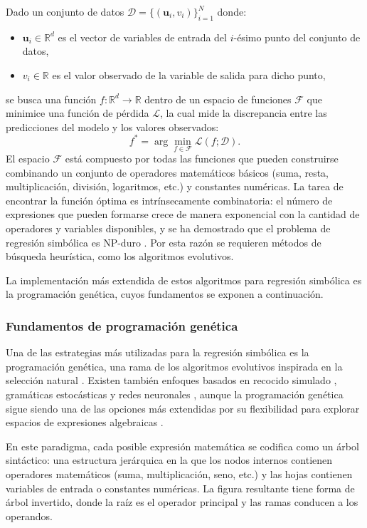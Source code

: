 \documentclass{article}
\newcommand{\R}{\mathbb{R}}
\newcommand{\loss}{\mathcal{L}}
\newcommand{\dataset}{\mathcal{D}}
\begin{document}
Dado un conjunto de datos \(\dataset = \{(\mathbf{u}_i, v_i)\}_{i=1}^{N}\) donde: \begin{itemize} \item \(\mathbf{u}_i \in \R^d\) es el vector de variables de entrada del \(i\)-ésimo punto del conjunto de datos, \item \(v_i \in \R\) es el valor observado de la variable de salida para dicho punto, \end{itemize} se busca una función \(f: \R^d \to \R\) dentro de un espacio de funciones \(\mathcal{F}\) que minimice una función de pérdida \(\loss\), la cual mide la discrepancia entre las predicciones del modelo y los valores observados: \begin{equation} f^* = \arg\min_{f \in \mathcal{F}} \loss(f; \dataset). \end{equation} El espacio \(\mathcal{F}\) está compuesto por todas las funciones que pueden construirse combinando un conjunto de operadores matemáticos básicos (suma, resta, multiplicación, división, logaritmos, etc.) y constantes numéricas. La tarea de encontrar la función óptima es intrínsecamente combinatoria: el número de expresiones que pueden formarse crece de manera exponencial con la cantidad de operadores y variables disponibles, y se ha demostrado que el problema de regresión simbólica es NP-duro \cite{virgolin2022np}. Por esta razón se requieren métodos de búsqueda heurística, como los algoritmos evolutivos.

La implementación más extendida de estos algoritmos para regresión simbólica es la programación genética, cuyos fundamentos se exponen a continuación.

\subsubsection{Fundamentos de programación genética}

Una de las estrategias más utilizadas para la regresión simbólica es la
programación genética, una rama de los algoritmos evolutivos inspirada en
la selección natural \cite{koza1992genetic}. Existen también enfoques
basados en recocido simulado \cite{kantor2021simulated}, gramáticas
estocásticas \cite{sotto2017probabilistic} y redes neuronales
\cite{costa2021occamnet, deng2024operator}, aunque la programación
genética sigue siendo una de las opciones más extendidas por su
flexibilidad para explorar espacios de expresiones algebraicas
\cite{koza1992genetic, cranmer2023pysr}.

En este paradigma, cada posible expresión matemática se codifica como un
árbol sintáctico: una estructura jerárquica en la que los nodos internos
contienen operadores matemáticos (suma, multiplicación, seno, etc.) y
las hojas contienen variables de entrada o constantes numéricas. La
figura resultante tiene forma de árbol invertido, donde la raíz es el
operador principal y las ramas conducen a los operandos.
\end{document}
